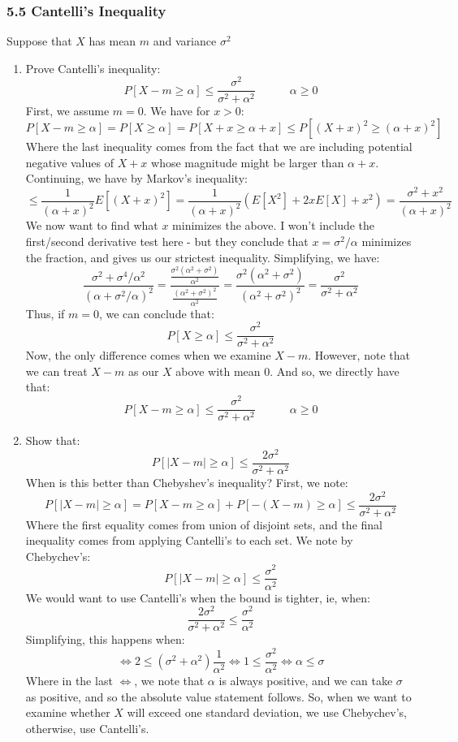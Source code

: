 \documentclass[12pt,a4paper]{article}
\newcommand{\1}[1]{\mathbbm{1}\left\{ #1 \right\}}
\begin{document}
\subsubsection{5.5 Cantelli's Inequality} Suppose that $X$ has mean $m$ and variance $\sigma^2$
\begin{enumerate}
	\item Prove Cantelli's inequality:
	$$
		P[X - m \geq \alpha] \leq \frac{\sigma^2}{\sigma^2 + \alpha^2} \quad\quad\quad \alpha \geq 0
	$$
	First, we assume $m = 0$. We have for $x > 0$:
	$$
		P[X - m \geq \alpha] = P[X \geq \alpha] = P[X + x \geq \alpha + x] \leq P[(X + x)^2 \geq (\alpha + x)^2]
	$$
	Where the last inequality comes from the fact that we are including potential negative values of $X + x$ whose magnitude might be larger than $\alpha + x$. Continuing, we have by Markov's inequality:
	$$
		\leq \frac{1}{(\alpha + x)^2} E[(X + x)^2] =
		\frac{1}{(\alpha + x)^2} \left(E[X^2] + 2xE[X] + x^2\right) =
		\frac{\sigma^2 + x^2}{(\alpha + x)^2}
	$$
	We now want to find what $x$ minimizes the above. I won't include the first/second derivative test here - but they conclude that $x = \sigma^2/\alpha$ minimizes the fraction, and gives us our strictest inequality. Simplifying, we have:
	$$
		\frac{\sigma^2 + \sigma^4/\alpha^2}{(\alpha + \sigma^2/\alpha)^2} =
		\frac{\frac{\sigma^2(\alpha^2 + \sigma^2)}{\alpha^2}}{\frac{(\alpha^2 + \sigma^2)^2}{\alpha^2}} =
		\frac{\sigma^2(\alpha^2 + \sigma^2)}{(\alpha^2 + \sigma^2)^2} =
		\frac{\sigma^2}{\sigma^2 + \alpha^2}
	$$
	Thus, if $m = 0$, we can conclude that:
	$$
		P[X \geq \alpha] \leq \frac{\sigma^2}{\sigma^2 + \alpha^2}
	$$
	Now, the only difference comes when we examine $X - m$. However, note that we can treat $X - m$ as our $X$ above with mean $0$. And so, we directly have that:
	$$
		P[X - m \geq \alpha] \leq \frac{\sigma^2}{\sigma^2 + \alpha^2} \quad\quad\quad \alpha \geq 0
	$$
	
	\item Show that:
	$$
		P[|X-m| \geq \alpha] \leq \frac{2\sigma^2}{\sigma^2 + \alpha^2}
	$$
	When is this better than Chebyshev's inequality? First, we note:
	$$
		P[|X-m| \geq \alpha] = P[X - m \geq \alpha] + P[-(X - m) \geq \alpha] \leq \frac{2\sigma^2}{\sigma^2 + \alpha^2}
	$$
	Where the first equality comes from union of disjoint sets, and the final inequality comes from applying Cantelli's to each set. We note by Chebychev's:
	$$
		P[|X-m| \geq \alpha] \leq \frac{\sigma^2}{\alpha^2}
	$$
	We would want to use Cantelli's when the bound is tighter, ie, when:
	$$
		\frac{2\sigma^2}{\sigma^2 + \alpha^2} \leq \frac{\sigma^2}{\alpha^2}
	$$
	Simplifying, this happens when:
	$$
		\iff 2 \leq (\sigma^2 + \alpha^2)\frac{1}{\alpha^2} \iff 1 \leq \frac{\sigma^2}{\alpha^2} \iff \alpha \leq \sigma
	$$
	Where in the last $\iff$, we note that $\alpha$ is always positive, and we can take $\sigma$ as positive, and so the absolute value statement follows. So, when we want to examine whether $X$ will exceed one standard deviation, we use Chebychev's, otherwise, use Cantelli's.
	

\end{enumerate}
\end{document}
